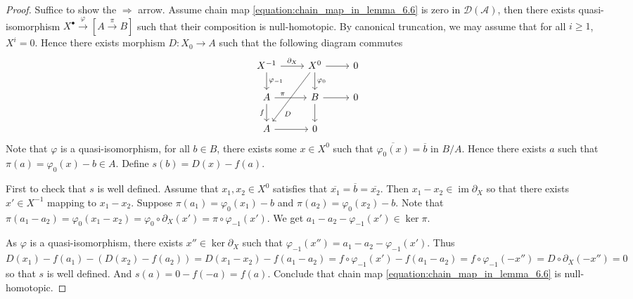 \documentclass{ctexart}
\newcommand{\im}{\operatorname{im}}
\begin{document}
\begin{proof}
    Suffice to show the $\Rightarrow$ arrow.
    Assume chain map \ref{equation:chain_map_in_lemma_6.6} is zero in $\mathcal{D}(\mathscr{A})$,
    then there exists quasi-isomorphism $X^{\bullet} \overset{\varphi}{\rightarrow} [A \overset{\pi}{\rightarrow} B]$ such that their composition is null-homotopic.
    By canonical truncation, we may assume that for all $i \ge 1$, $X^{i} = 0$.
    Hence there exists morphism $D: X_{0} \rightarrow A$ such that the following diagram commutes
    \begin{equation}
        \begin{tikzcd}
            X^{-1} \arrow[r, "\partial_{X}"] \arrow[d, "\varphi_{-1}"] &
            X^{0} \arrow[r] \arrow[d, "\varphi_{0}"] \arrow[ddl, "D" near end] &
            0 \\
            A \arrow[r, "\pi" near start] \arrow[d, "f" swap] &
            B \arrow[r] \arrow[d] & 
            0 \\
            A \arrow[r] &
            0
        \end{tikzcd}
    \end{equation}
    Note that $\varphi$ is a quasi-isomorphism, for all $b\in B$,
    there exists some $x\in X^{0}$ such that $\overline{\varphi_{0}(x)} = \overline{b}$ in $B/A$.
    Hence there exists $a$ such that $\pi(a) = \varphi_{0}(x) - b\in A$.
    Define $s(b) = D(x) - f(a)$.
    \par
    First to check that $s$ is well defined.
    Assume that $x_{1},x_{2}\in X^{0}$ satisfies that $\overline{x_{1}} = \overline{b} = \overline{x_{2}}$.
    Then $x_{1} - x_{2}\in \im \partial_{X}$ so that there exists $x'\in X^{-1}$ mapping to $x_{1} - x_{2}$.
    Suppose $\pi(a_{1}) = \varphi_{0}(x_{1}) - b$ and $\pi(a_{2}) = \varphi_{0}(x_{2}) - b$.
    Note that $\pi(a_{1} - a_{2}) = \varphi_{0}(x_{1} - x_{2}) = \varphi_{0} \circ \partial_{X}(x') = \pi \circ \varphi_{-1}(x')$.
    We get $a_{1} - a_{2} - \varphi_{-1}(x')\in \ker \pi$.
    \par
    As $\varphi$ is a quasi-isomorphism, there exists $x''\in \ker \partial_{X}$ such that $\varphi_{-1}(x'') = a_{1} - a_{2} - \varphi_{-1}(x')$.
    Thus $D(x_{1}) - f(a_{1}) - (D(x_{2}) - f(a_{2})) = D(x_{1} - x_{2}) - f(a_{1} - a_{2}) = f \circ \varphi_{-1}(x') - f(a_{1} - a_{2}) = f \circ \varphi_{-1}(-x'') = D \circ \partial_{X}(-x'') = 0$ so that $s$ is well defined.
    And $s(a) = 0 - f(-a) = f(a)$.
    Conclude that chain map \ref{equation:chain_map_in_lemma_6.6} is null-homotopic.
\end{proof}
\end{document}
